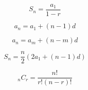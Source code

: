 \[\begin{equation} \label{Geometric Sum of an Infinte} S_{n}=\frac{a_{1}}{1-r} \end{equation}\]

\[\begin{equation} \label{Arithmetic Formula with a1} a_{n}=a_{1}+(n-1)d \end{equation}\]

\[\begin{equation} \label{Arithmetic Formula with n&m} a_{n}=a_{m}+(n-m)d \end{equation}\]

\[\begin{equation} \label{Arithmetic Sum for Finite} S_{n}=\frac{n}{2}(2a_{1}+(n-1)d) \end{equation}\]

\[\begin{equation} \label{Combinations Calculation} _{n}C_{r}=\frac{n!}{r!(n-r)!} \end{equation}\]


